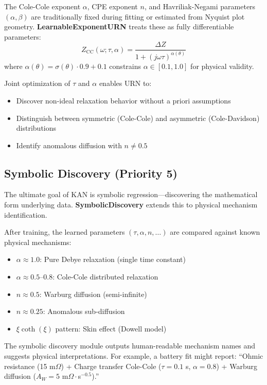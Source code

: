 \documentclass{ieeeaccess}
\begin{document}
The Cole-Cole exponent $\alpha$, CPE exponent $n$, and Havriliak-Negami parameters $(\alpha, \beta)$ are traditionally fixed during fitting or estimated from Nyquist plot geometry. \textbf{LearnableExponentURN} treats these as fully differentiable parameters:
\begin{equation}
Z_{\text{CC}}(\omega; \tau, \alpha) = \frac{\Delta Z}{1 + (j\omega\tau)^{\alpha(\theta)}}
\end{equation}
where $\alpha(\theta) = \sigma(\theta) \cdot 0.9 + 0.1$ constrains $\alpha \in [0.1, 1.0]$ for physical validity.

Joint optimization of $\tau$ and $\alpha$ enables URN to:
\begin{itemize}
\item Discover non-ideal relaxation behavior without a priori assumptions
\item Distinguish between symmetric (Cole-Cole) and asymmetric (Cole-Davidson) distributions
\item Identify anomalous diffusion with $n \neq 0.5$
\end{itemize}

\subsection{Symbolic Discovery (Priority 5)}
\label{sec:symbolic}

The ultimate goal of KAN is symbolic regression---discovering the mathematical form underlying data. \textbf{SymbolicDiscovery} extends this to physical mechanism identification.

After training, the learned parameters $(\tau, \alpha, n, \ldots)$ are compared against known physical mechanisms:
\begin{itemize}
\item $\alpha \approx 1.0$: Pure Debye relaxation (single time constant)
\item $\alpha \approx 0.5$--$0.8$: Cole-Cole distributed relaxation
\item $n \approx 0.5$: Warburg diffusion (semi-infinite)
\item $n \approx 0.25$: Anomalous sub-diffusion
\item $\xi\coth(\xi)$ pattern: Skin effect (Dowell model)
\end{itemize}

The symbolic discovery module outputs human-readable mechanism names and suggests physical interpretations. For example, a battery fit might report: ``Ohmic resistance (15 m$\Omega$) + Charge transfer Cole-Cole ($\tau = 0.1$ s, $\alpha = 0.8$) + Warburg diffusion ($A_W = 5$ m$\Omega \cdot$s$^{-0.5}$).''
\end{document}
